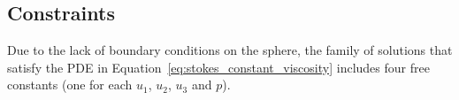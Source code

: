 \subsection{Constraints} 
Due to the lack of boundary conditions on the sphere, the family of solutions that satisfy the PDE in Equation~\ref{eq:stokes_constant_viscosity} includes four free constants (one for each $u_1$, $u_2$, $u_3$ and $p$). 


